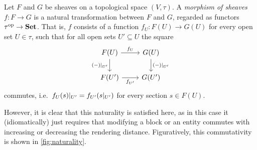 {		\begin{definition}\label{def:sheaf-morphism}
			Let $F$ and $G$ be sheaves on a topological space $(V, \tau)$. A
			\emph{morphism of sheaves} $f \colon F \to G$ is a natural transformation
			between $F$ and $G$, regarded as functors $\tau^{\mathrm{op}} \to \mathbf{Set}$.
			That is, $f$ consists of a function $f_U \colon F(U) \to G(U)$ for every
			open set $U \in \tau$, such that for all open sets $U' \subseteq U$ the
			square
			\[
				\begin{tikzcd}
					F(U) \ar[r, "f_U"] \ar[d, "\restr{(-)}{U'}"']
					& G(U) \ar[d, "\restr{(-)}{U'}"] \\
					F(U') \ar[r, "f_{U'}"']
					& G(U')
				\end{tikzcd}
			\]
			commutes, i.e.\ $f_U(s)|_{U'} = f_{U'}(s|_{U'})$ for every
			section $s \in F(U)$.
		\end{definition}

		However, it is clear that this naturality is satisfied here, as in this case it
		(idiomatically) just requires that modifying a block or an entity commutes with
		increasing or decreasing the rendering distance. Figuratively, this
		commutativity is shown in \cref{fig:naturality}.

}
